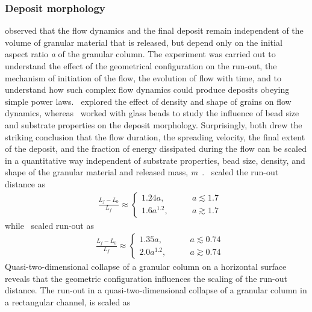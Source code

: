 \subsubsection{Deposit morphology}
\citet{Lajeunesse2005} observed that the flow dynamics and the final deposit 
remain independent of the volume of granular material that is released, but 
depend only on the initial aspect ratio \textit{a} of the granular column. 
The experiment was carried out to understand the effect of the geometrical 
configuration on the run-out, the mechanism of initiation of the flow, the 
evolution of flow with time, and to understand how such complex flow dynamics 
could produce deposits obeying simple power laws.~\citet{Lube2005} explored the 
effect of density and shape of grains on flow dynamics, 
whereas~\citet{Lajeunesse2004} worked with glass beads to study the influence 
of bead size and substrate properties on the deposit morphology. Surprisingly, 
both drew the striking conclusion that the flow duration, the spreading 
velocity, the final extent of the deposit, and the fraction of energy 
dissipated during the flow can be scaled in a quantitative way independent of 
substrate properties, bead size, density, and shape of the granular material 
and released mass, \textit{m}~\citep{Lajeunesse2005}.~\citet{Lube2005} scaled 
the run-out distance as
\begin{align}
& \frac{\textit{L}_{\textit{f}}- 
\textit{L}_{\textit{0}}}{\textit{L}_{\textit{f}}} \approx
\begin{cases} 
1.24\textit{a}, \qquad &\textit{a} \lesssim 1.7 \\
1.6\textit{a}^{1.2}, \qquad &\textit{a} \gtrsim 1.7
\end{cases}
\end{align}
while~\citet{Lajeunesse2004} scaled run-out as
\begin{align}
& \frac{\textit{L}_{\textit{f}}- 
\textit{L}_{\textit{0}}}{\textit{L}_{\textit{f}}} \approx
\begin{cases} 
1.35\textit{a}, \qquad &\textit{a} \lesssim 0.74 \\
2.0\textit{a}^{1.2}, \qquad &\textit{a} \gtrsim 0.74
\end{cases}
\end{align} 
Quasi-two-dimensional collapse of a granular column on a horizontal 
surface~\citep{Lajeunesse2005} reveals that the geometric configuration 
influences the scaling of the run-out distance. The run-out in a 
quasi-two-dimensional collapse of a granular column in a rectangular channel, 
is scaled as 
